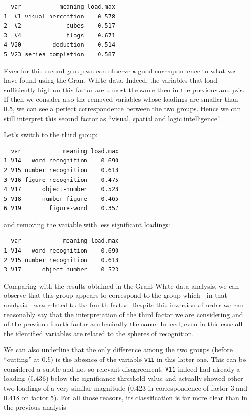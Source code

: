 \documentclass[
  letterpaper,
  DIV=11,
  numbers=noendperiod]{scrartcl}
\begin{document}
\begin{verbatim}
  var           meaning load.max
1  V1 visual perception    0.578
2  V2             cubes    0.517
3  V4             flags    0.671
4 V20         deduction    0.514
5 V23 series completion    0.587
\end{verbatim}

Even for this second group we can observe a good correspondence to what
we have found using the Grant-White data. Indeed, the variables that
load sufficiently high on this factor are almost the same then in the
previous analysis. If then we consider also the removed variables whose
loadings are smaller than 0.5, we can see a perfect correspondence
between the two groups. Hence we can still interpret this second factor
as ``visual, spatial and logic intelligence''.

Let's switch to the third group:

\begin{verbatim}
  var            meaning load.max
1 V14   word recognition    0.690
2 V15 number recognition    0.613
3 V16 figure recognition    0.475
4 V17      object-number    0.523
5 V18      number-figure    0.465
6 V19        figure-word    0.357
\end{verbatim}

and removing the variable with less significant loadings:

\begin{verbatim}
  var            meaning load.max
1 V14   word recognition    0.690
2 V15 number recognition    0.613
3 V17      object-number    0.523
\end{verbatim}

Comparing with the results obtained in the Grant-White data analysis, we
can observe that this group appears to correspond to the group which -
in that analysis - was related to the fourth factor. Despite this
inversion of order we can reasonably say that the interpretation of the
third factor we are considering and of the previous fourth factor are
basically the same. Indeed, even in this case all the identified
variables are related to the spheres of recognition.

We can also underline that the only difference among the two groups
(before ``cutting'' at 0.5) is the absence of the variable \texttt{V11}
in this latter one. This can be considered a subtle and not so relevant
disagreement: \texttt{V11} indeed had already a loading (0.436) below
the significance threshold value and actually showed other two loadings
of a very similar magnitude (0.423 in correspondence of factor 3 and
0.418 on factor 5). For all those reasons, its classification is far
more clear than in the previous analysis.
\end{document}

